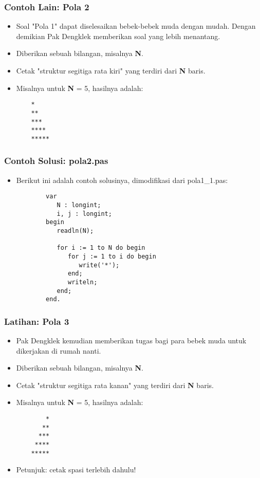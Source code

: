 \documentclass{beamer}
\begin{document}
\begin{frame}[fragile]
\frametitle{Contoh Lain: Pola 2}
\begin{itemize}
    \item Soal "Pola 1" dapat diselesaikan bebek-bebek muda dengan mudah. Dengan demikian Pak Dengklek memberikan soal yang lebih menantang.
    \item Diberikan sebuah bilangan, misalnya \textbf{N}.
    \item Cetak "struktur segitiga rata kiri" yang terdiri dari \textbf{N} baris.
    \item Misalnya untuk \textbf{N} = 5, hasilnya adalah:
    \begin{lstlisting}
    *
    **
    ***
    ****
    *****
    \end{lstlisting}
\end{itemize}
\end{frame}

\begin{frame}[fragile]
\frametitle{Contoh Solusi: pola2.pas}
\begin{itemize}
    \item Berikut ini adalah contoh solusinya, dimodifikasi dari pola1\_1.pas:
    \begin{lstlisting}
        var
           N : longint;
           i, j : longint;
        begin
           readln(N);

           for i := 1 to N do begin
              for j := 1 to i do begin
                 write('*');
              end;
              writeln;
           end;
        end.
    \end{lstlisting}
\end{itemize}
\end{frame}

\begin{frame}[fragile]
\frametitle{Latihan: Pola 3}
\begin{itemize}
    \item Pak Dengklek kemudian memberikan tugas bagi para bebek muda untuk dikerjakan di rumah nanti.
    \item Diberikan sebuah bilangan, misalnya \textbf{N}.
    \item Cetak "struktur segitiga rata kanan" yang terdiri dari \textbf{N} baris.
    \item Misalnya untuk \textbf{N} = 5, hasilnya adalah:
    \begin{lstlisting}
        *
       **
      ***
     ****
    *****
    \end{lstlisting}
    \item Petunjuk: cetak spasi terlebih dahulu!
\end{itemize}
\end{frame}
\end{document}
